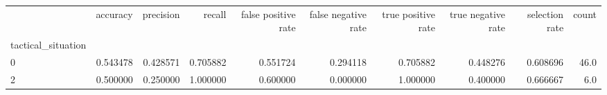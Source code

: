 \begin{tabular}{lrrrrrrrrr}
\toprule
{} &  accuracy &  precision &    recall &  false positive rate &  false negative rate &  true positive rate &  true negative rate &  selection rate &  count \\
tactical\_situation &           &            &           &                      &                      &                     &                     &                 &        \\
\midrule
0                  &  0.543478 &   0.428571 &  0.705882 &             0.551724 &             0.294118 &            0.705882 &            0.448276 &        0.608696 &   46.0 \\
2                  &  0.500000 &   0.250000 &  1.000000 &             0.600000 &             0.000000 &            1.000000 &            0.400000 &        0.666667 &    6.0 \\
\bottomrule
\end{tabular}
